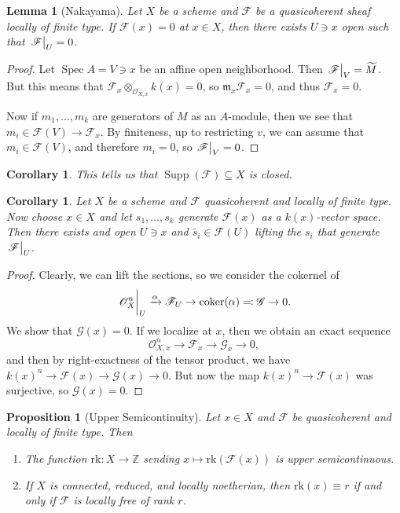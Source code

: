 \documentclass[leqno, openany]{memoir}
\newtheorem{cor}[thm]{Corollary}
\newtheorem{prop}[thm]{Proposition}
\newtheorem{lem}[thm]{Lemma}
\theoremstyle{definition}
\theoremstyle{remark}
\theoremstyle{plain}
\theoremstyle{definition}
\theoremstyle{remark}
\newcommand{\Z}{\mathbb{Z}}
\newcommand{\mf}[1]{\mathfrak{#1}}
\newcommand{\mr}[1]{\mathrm{#1}}
\newcommand{\msc}[1]{\mathscr{#1}}
\newcommand{\wt}[1]{\widetilde{#1}}
\DeclareMathOperator{\Supp}{Supp}
\DeclareMathOperator{\Spec}{Spec}
\begin{document}
\begin{lem}[Nakayama]
    Let $X$ be a scheme and $\msc{F}$ be a quasicoherent sheaf locally of finite type. If $\msc{F}(x) = 0$ at $x \in X$, then there exists $U \ni x$ open such that $\eval{\msc{F}}_U = 0$.
\end{lem}

\begin{proof}
    Let $\Spec A = V \ni x$ be an affine open neighborhood. Then $\eval{\msc{F}}_V = \wt{M}$. But this means that $\msc{F}_x \otimes_{\msc{O}_{X,x}} k(x) = 0$, so $\mf{m}_x \msc{F}_x = 0$, and thus $\msc{F}_x = 0$.

    Now if $m_1, \ldots, m_k$ are generators of $M$ as an $A$-module, then we see that $m_i \in \msc{F}(V) \to \msc{F}_x$. By finiteness, up to restricting $v$, we can assume that $m_i \in \msc{F}(V)$, and therefore $m_i = 0$, so $\eval{\msc{F}}_V = 0$.
\end{proof}

\begin{cor}
    This tells us that $\Supp (\msc{F}) \subseteq X$ is closed.
\end{cor}

\begin{cor}
    Let $X$ be a scheme and $\msc{F}$ quasicoherent and locally of finite type. Now choose $x \in X$ and let $s_1, \ldots, s_k$ generate $\msc{F}(x)$ as a $k(x)$-vector space. Then there exists and open $U \ni x$ and $\wt{s_i} \in \msc{F}(U)$ lifting the $s_i$ that generate $\eval{\msc{F}}_U$.
\end{cor}

\begin{proof}
    Clearly, we can lift the sections, so we consider the cokernel of
    \[ \eval{\msc{O}_X^n}_U \xrightarrow{\alpha} \msc{F}_U \to \mr{coker}(\alpha) \eqqcolon \msc{G} \to 0. \]
    We show that $\msc{G}(x) = 0$. If we localize at $x$, then we obtain an exact sequence
    \[ \msc{O}_{X,x}^n \to \msc{F}_x \to \msc{G}_x \to 0, \]
    and then by right-exactness of the tensor product, we have ${k(x)}^n \to \msc{F}(x) \to \msc{G}(x) \to 0$. But now the map ${k(x)}^n \to \msc{F}(x)$ was surjective, so $\msc{G}(x) = 0$.
\end{proof}

\begin{prop}[Upper Semicontinuity]
    Let $x \in X$ and $\msc{F}$ be quasicoherent and locally of finite type. Then
    \begin{enumerate}
        \item The function $\mr{rk} \colon X \to \Z$ sending $x \mapsto \mr{rk}(\msc{F}(x))$ is upper semicontinuous.
        \item If $X$ is connected, reduced, and locally noetherian, then $\mr{rk}(x) \equiv r$ if and only if $\msc{F}$ is locally free of rank $r$.
    \end{enumerate}
\end{prop}
\end{document}
